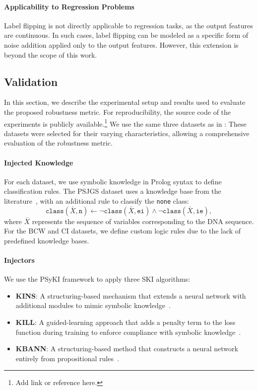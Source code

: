 %
\paragraph{Applicability to Regression Problems}
%
Label flipping is not directly applicable to regression tasks, as the output features are continuous.
%
In such cases, label flipping can be modeled as a specific form of noise addition applied only to the output features.
%
However, this extension is beyond the scope of this work.


\subsection{Validation}\label{subsec:empirical-study-on-the-robustness-of-ski-methods-validation}
%
In this section, we describe the experimental setup and results used to evaluate the proposed robustness metric.
%
For reproducibility, the source code of the experiments is publicly available.\footnote{Add link or reference here.}
%
We use the same three datasets as in :
%
These datasets were selected for their varying characteristics, allowing a comprehensive evaluation of the robustness metric.

%
\paragraph{Injected Knowledge}
%
For each dataset, we use symbolic knowledge in Prolog syntax to define classification rules.
%
The \gls{PSJGS} dataset uses a knowledge base from the literature~\cite{placeholder}, with an additional rule to classify the \texttt{none} class:
%
\[
\texttt{class}(\bar{X}, \texttt{n}) \leftarrow \neg \texttt{class}(\bar{X}, \texttt{ei}) \land \neg \texttt{class}(\bar{X}, \texttt{ie}),
\]
%
where \(\bar{X}\) represents the sequence of variables corresponding to the DNA sequence.
%
For the \gls{BCW} and \gls{CI} datasets, we define custom logic rules due to the lack of predefined knowledge bases.

%
\paragraph{Injectors}
%
We use the \gls{PSyKI} framework to apply three \gls{SKI} algorithms:
%
\begin{itemize}
    \item \textbf{\gls{KINS}}: A structuring-based mechanism that extends a neural network with additional modules to mimic symbolic knowledge~\cite{placeholder}.
    \item \textbf{\gls{KILL}}: A guided-learning approach that adds a penalty term to the loss function during training to enforce compliance with symbolic knowledge~\cite{placeholder}.
    \item \textbf{\gls{KBANN}}: A structuring-based method that constructs a neural network entirely from propositional rules~\cite{placeholder}.
\end{itemize}

